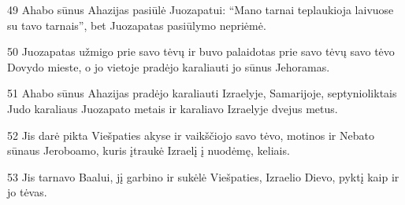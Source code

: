 \par 49 Ahabo sūnus Ahazijas pasiūlė Juozapatui: “Mano tarnai teplaukioja laivuose su tavo tarnais”, bet Juozapatas pasiūlymo nepriėmė. 
\par 50 Juozapatas užmigo prie savo tėvų ir buvo palaidotas prie savo tėvų savo tėvo Dovydo mieste, o jo vietoje pradėjo karaliauti jo sūnus Jehoramas. 
\par 51 Ahabo sūnus Ahazijas pradėjo karaliauti Izraelyje, Samarijoje, septynioliktais Judo karaliaus Juozapato metais ir karaliavo Izraelyje dvejus metus. 
\par 52 Jis darė pikta Viešpaties akyse ir vaikščiojo savo tėvo, motinos ir Nebato sūnaus Jeroboamo, kuris įtraukė Izraelį į nuodėmę, keliais. 
\par 53 Jis tarnavo Baalui, jį garbino ir sukėlė Viešpaties, Izraelio Dievo, pyktį kaip ir jo tėvas.


